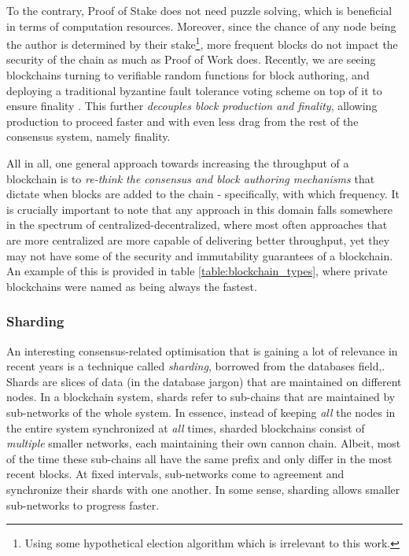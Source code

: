 To the contrary, Proof of Stake does not need puzzle solving, which is beneficial in terms of
computation resources. Moreover, since the chance of any node being the author is determined by
their stake\footnote{Using some hypothetical election algorithm which is irrelevant to this work.},
more frequent blocks do not impact the security of the chain as much as Proof of Work does. Recently, we are seeing blockchains turning to
verifiable random functions \cite{dodisVerifiableRandomFunction2005} for block authoring, and
deploying a traditional byzantine fault tolerance voting scheme on top of it to ensure finality
\cite{buterinCasperFriendlyFinality2019, stewartPosterGRANDPAFinality2019}. This further
\textit{decouples block production and finality}, allowing production to proceed faster and with
even less drag from the rest of the consensus system, namely finality.

All in all, one general approach towards increasing the throughput of a blockchain is to
\textit{re-think the consensus and block authoring mechanisms} that dictate when blocks are added to
the chain - specifically, with which frequency. It is crucially important to note that any approach
in this domain falls somewhere in the spectrum of centralized-decentralized, where most often
approaches that are more centralized are more capable of delivering better throughput, yet they may
not have some of the security and immutability guarantees of a blockchain. An example of this is
provided in table \ref{table:blockchain_types}, where private blockchains were named as being always
the fastest.

\subsubsection{Sharding}
An interesting consensus-related optimisation that is gaining a lot of relevance in recent years is
a technique called \textit{sharding}, borrowed from the databases field,. Shards are slices of data
(in the database jargon) that are maintained on different nodes. In a blockchain system, shards
refer to sub-chains that are maintained by sub-networks of the whole system. In essence, instead of
keeping \textit{all} the nodes in the entire system synchronized at \textit{all} times, sharded
blockchains consist of \textit{multiple} smaller networks, each maintaining their own cannon chain.
Albeit, most of the time these sub-chains all have the same prefix and only differ in the most
recent blocks. At fixed intervals, sub-networks come to agreement and synchronize their shards with
one another. In some sense, sharding allows smaller sub-networks to progress
faster\cite{forestierBlockcliqueScalingBlockchains2019, al-bassamChainspaceShardedSmart2017,
shreyDiPETransFrameworkDistributed2019}.

